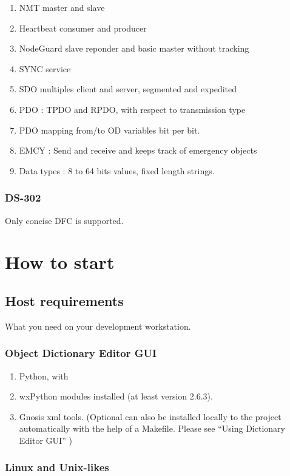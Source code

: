 \documentclass[12pt,english,a4paper]{book}
\begin{document}
\begin{enumerate}
\item NMT master and slave
\item Heartbeat consumer and producer
\item NodeGuard slave reponder and basic master without tracking
\item SYNC service
\item SDO multiples client and server, segmented and expedited
\item PDO : TPDO and RPDO, with respect to transmission type
\item PDO mapping from/to OD variables bit per bit. 
\item EMCY : Send and receive and keeps track of emergency objects
\item Data types : 8 to 64 bits values, fixed length strings.
\end{enumerate}

\subsubsection{DS-302}

Only concise DFC is supported.

\section{How to start}

\subsection{Host requirements}

What you need on your development workstation.

\subsubsection{Object Dictionary Editor GUI}

\begin{enumerate}
\item Python, with 
\item wxPython modules installed (at least version 2.6.3).
\item Gnosis xml tools. (Optional can also be installed locally to the project
automatically with the help of a Makefile. Please see {}``Using Dictionary
Editor GUI'' ) 
\end{enumerate}

\subsubsection{Linux and Unix-likes}
\end{document}
